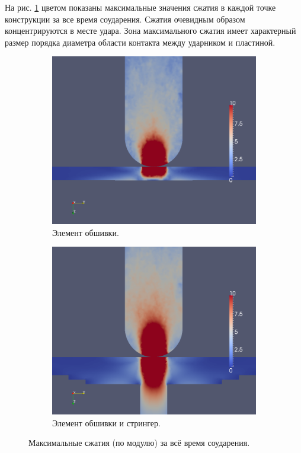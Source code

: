 \clearpage
\newpage

На рис. \ref{pic:pkm_experiment_compression} цветом показаны максимальные значения сжатия в каждой точке конструкции за все время соударения. Сжатия очевидным образом концентрируются в месте удара. Зона максимального сжатия имеет характерный размер порядка диаметра области контакта между ударником и пластиной.

\begin{figure}[htp]
\begin{subfigure}[b]{0.5\textwidth}
\centering
\includegraphics[width=\textwidth]{png/pkm-experiment/wing-only/compression.png}
\caption{Элемент обшивки.}
\end{subfigure}
\begin{subfigure}[b]{0.5\textwidth}
\centering
\includegraphics[width=\textwidth]{png/pkm-experiment/wing-stringer/compression.png}
\caption{Элемент обшивки и стрингер.}
\end{subfigure}
\caption{Максимальные сжатия (по модулю) за всё время соударения.}
\label{pic:pkm_experiment_compression}
\end{figure}

